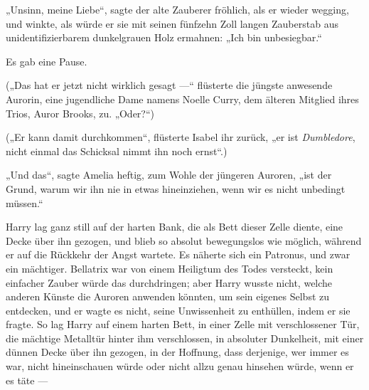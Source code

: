 „Unsinn, meine Liebe“, sagte der alte Zauberer fröhlich, als er wieder wegging, und winkte, als würde er sie mit seinen fünfzehn Zoll langen Zauberstab aus unidentifizierbarem dunkelgrauen Holz ermahnen:
„Ich bin unbesiegbar.“

Es gab eine Pause.

(„Das hat er jetzt nicht wirklich gesagt —“ flüsterte die jüngste anwesende Aurorin, eine jugendliche Dame namens Noelle Curry, dem älteren Mitglied ihres Trios, Auror Brooks, zu.
„Oder?“)

(„Er kann damit durchkommen“, flüsterte Isabel ihr zurück, „er ist \emph{Dumbledore}, nicht einmal das Schicksal nimmt ihn noch ernst“.)

„Und das“, sagte Amelia heftig, zum Wohle der jüngeren Auroren, „ist der Grund, warum wir ihn nie in etwas hineinziehen, wenn wir es nicht unbedingt müssen.“

\later

Harry lag ganz still auf der harten Bank, die als Bett dieser Zelle diente, eine Decke über ihn gezogen, und blieb so absolut bewegungslos wie möglich, während er auf die Rückkehr der Angst wartete. Es näherte sich ein Patronus, und zwar ein mächtiger. Bellatrix war von einem Heiligtum des Todes versteckt, kein einfacher Zauber würde das durchdringen; aber Harry wusste nicht, welche anderen Künste die Auroren anwenden könnten, um sein eigenes Selbst zu entdecken, und er wagte es nicht, seine Unwissenheit zu enthüllen, indem er sie fragte. So lag Harry auf einem harten Bett, in einer Zelle mit verschlossener Tür, die mächtige Metalltür hinter ihm verschlossen, in absoluter Dunkelheit, mit einer dünnen Decke über ihn gezogen, in der Hoffnung, dass derjenige, wer immer es war, nicht hineinschauen würde oder nicht allzu genau hinsehen würde, wenn er es täte —


